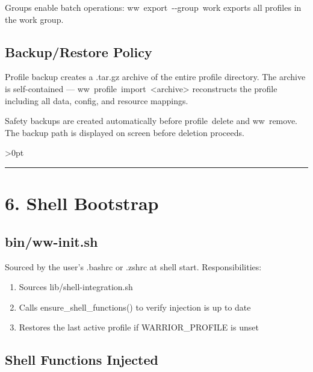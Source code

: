 \documentclass[11pt, a4paper, DIV=14]{scrartcl}
\renewcommand{\texttt}[1]{{\ttfamily\fontsize{8.5}{10.5}\selectfont\color{BabbNavy}#1}}
\providecommand{\tightlist}{\setlength{\itemsep}{2pt}\setlength{\parskip}{0pt}}
\let\origRule\rule
\renewcommand{\rule}[3][0pt]{%
  \ifnum\dimexpr#3\relax>0pt
    \par\vspace{2pt}\noindent{\color{BabbBorder}\origRule[#1]{#2}{#3}}\par\vspace{2pt}%
  \else
    \origRule[#1]{#2}{#3}%
  \fi
}
\begin{document}
Groups enable batch operations: \texttt{ww\ export\ -\/-group\ work}
exports all profiles in the \texttt{work} group.

\subsection{Backup/Restore Policy}\label{backuprestore-policy}

Profile backup creates a \texttt{.tar.gz} archive of the entire profile
directory. The archive is self-contained ---
\texttt{ww\ profile\ import\ \textless{}archive\textgreater{}}
reconstructs the profile including all data, config, and resource
mappings.

Safety backups are created automatically before \texttt{profile\ delete}
and \texttt{ww\ remove}. The backup path is displayed on screen before
deletion proceeds.

\begin{center}\rule{0.5\linewidth}{0.5pt}\end{center}

\section{6. Shell Bootstrap}\label{shell-bootstrap}

\subsection{bin/ww-init.sh}\label{binww-init.sh}

Sourced by the user's \texttt{.bashrc} or \texttt{.zshrc} at shell
start. Responsibilities:

\begin{enumerate}
\def\labelenumi{\arabic{enumi}.}
\tightlist
\item
  Sources \texttt{lib/shell-integration.sh}
\item
  Calls \texttt{ensure\_shell\_functions()} to verify injection is up to
  date
\item
  Restores the last active profile if \texttt{WARRIOR\_PROFILE} is unset
\end{enumerate}

\subsection{Shell Functions Injected}\label{shell-functions-injected}
\end{document}

